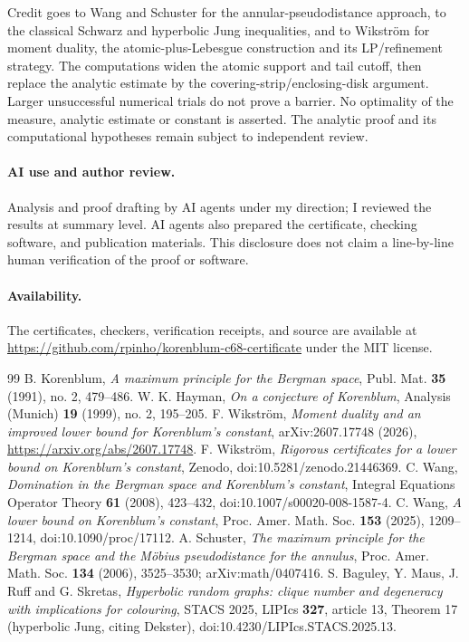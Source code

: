 \documentclass[11pt]{article}
\begin{document}
Credit goes to Wang and Schuster for the annular-pseudodistance approach,
to the classical Schwarz and hyperbolic Jung inequalities, and to Wikstr\"om
for moment duality, the atomic-plus-Lebesgue construction and its LP/refinement
strategy. The computations widen the atomic support and tail cutoff, then
replace the analytic estimate by the covering-strip/enclosing-disk argument.
Larger unsuccessful numerical trials do not prove a barrier. No optimality
of the measure, analytic estimate or constant is asserted. The analytic proof
and its computational hypotheses remain subject to independent review.

\paragraph{AI use and author review.}
Analysis and proof drafting by AI agents under my direction; I reviewed the
results at summary level. AI agents also prepared the certificate, checking
software, and publication materials. This disclosure does not claim a
line-by-line human verification of the proof or software.

\paragraph{Availability.}
The certificates, checkers, verification receipts, and source are available at
\url{https://github.com/rpinho/korenblum-c68-certificate} under the MIT license.

\begin{thebibliography}{99}
 B. Korenblum, \emph{A maximum principle for the Bergman
space}, Publ. Mat. \textbf{35} (1991), no. 2, 479--486.
 W. K. Hayman, \emph{On a conjecture of Korenblum},
Analysis (Munich) \textbf{19} (1999), no. 2, 195--205.
 F. Wikstr\"om, \emph{Moment duality and an improved lower
bound for Korenblum's constant}, arXiv:2607.17748 (2026),
\url{https://arxiv.org/abs/2607.17748}.
 F. Wikstr\"om, \emph{Rigorous certificates for a lower bound on
Korenblum's constant}, Zenodo, doi:10.5281/zenodo.21446369.
 C. Wang, \emph{Domination in the Bergman space and
Korenblum's constant}, Integral Equations Operator Theory \textbf{61}
(2008), 423--432, doi:10.1007/s00020-008-1587-4.
 C. Wang, \emph{A lower bound on Korenblum's constant},
Proc. Amer. Math. Soc. \textbf{153} (2025), 1209--1214,
doi:10.1090/proc/17112.
 A. Schuster, \emph{The maximum principle for the Bergman
space and the M\"obius pseudodistance for the annulus}, Proc. Amer. Math.
Soc. \textbf{134} (2006), 3525--3530; arXiv:math/0407416.
 S. Baguley, Y. Maus, J. Ruff and G. Skretas,
\emph{Hyperbolic random graphs: clique number and degeneracy with implications
for colouring}, STACS 2025, LIPIcs \textbf{327}, article 13, Theorem 17
(hyperbolic Jung, citing Dekster), doi:10.4230/LIPIcs.STACS.2025.13.
\end{thebibliography}
\end{document}
